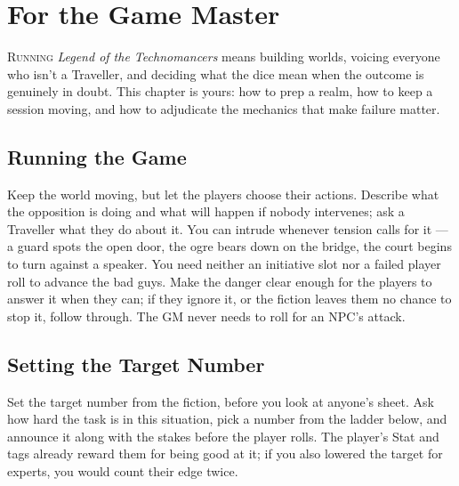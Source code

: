 \renewcommand{\realmaccent}{atrAccent}  %
\chapter{For the Game Master}
\begin{readaloud}
\lipsum[51][1-3]
\end{readaloud}

\lettrine{R}{unning} \emph{Legend of the Technomancers} means building
worlds, voicing everyone who isn't a Traveller, and deciding what the
dice mean when the outcome is genuinely in doubt. This chapter is yours:
how to prep a realm, how to keep a session moving, and how to adjudicate
the mechanics that make failure matter.

\section{Running the Game}
Keep the world moving, but let the players choose their actions. Describe
what the opposition is doing and what will happen if nobody intervenes;
ask a Traveller what they do about it. You can intrude whenever tension
calls for it --- a guard spots the open door, the ogre bears down on the
bridge, the court begins to turn against a speaker. You need neither an
initiative slot nor a failed player roll to advance the bad guys. Make
the danger clear enough for the players to answer it when they can; if
they ignore it, or the fiction leaves them no chance to stop it, follow
through. The GM never needs to roll for an NPC's attack.

\section{Setting the Target Number}
Set the target number from the fiction, before you look at anyone's
sheet. Ask how hard the task is in this situation, pick a number from
the ladder below, and announce it along with the stakes before the
player rolls. The player's Stat and tags already reward them for being
good at it; if you also lowered the target for experts, you would count
their edge twice.

